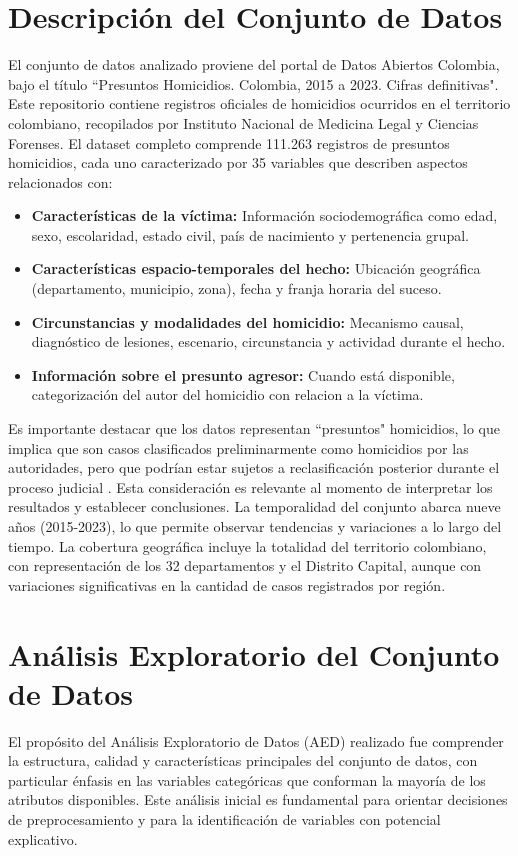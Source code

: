\documentclass[lettersize,journal]{IEEEtran}
\begin{document}
\section{Descripción del Conjunto de Datos}
El conjunto de datos analizado proviene del portal de Datos Abiertos Colombia, bajo el título ``Presuntos Homicidios. Colombia, 2015 a 2023. Cifras definitivas". Este repositorio contiene registros oficiales de homicidios ocurridos en el territorio colombiano, recopilados por Instituto Nacional de Medicina Legal y Ciencias Forenses.
El dataset completo comprende 111.263 registros de presuntos homicidios, cada uno caracterizado por 35 variables que describen aspectos relacionados con:
\begin{itemize}
\item \textbf{Características de la víctima:} Información sociodemográfica como edad, sexo, escolaridad, estado civil, país de nacimiento y pertenencia grupal.
\item \textbf{Características espacio-temporales del hecho:} Ubicación geográfica (departamento, municipio, zona), fecha y franja horaria del suceso.
\item \textbf{Circunstancias y modalidades del homicidio:} Mecanismo causal, diagnóstico de lesiones, escenario, circunstancia y actividad durante el hecho.
\item \textbf{Información sobre el presunto agresor:} Cuando está disponible, categorización del autor del homicidio con relacion a la víctima.
\end{itemize}
Es importante destacar que los datos representan ``presuntos" homicidios, lo que implica que son casos clasificados preliminarmente como homicidios por las autoridades, pero que podrían estar sujetos a reclasificación posterior durante el proceso judicial \cite{Datos2023}. Esta consideración es relevante al momento de interpretar los resultados y establecer conclusiones.
La temporalidad del conjunto abarca nueve años (2015-2023), lo que permite observar tendencias y variaciones a lo largo del tiempo. La cobertura geográfica incluye la totalidad del territorio colombiano, con representación de los 32 departamentos y el Distrito Capital, aunque con variaciones significativas en la cantidad de casos registrados por región.
\section{Análisis Exploratorio del Conjunto de Datos}
El propósito del Análisis Exploratorio de Datos (AED) realizado fue comprender la estructura, calidad y características principales del conjunto de datos, con particular énfasis en las variables categóricas que conforman la mayoría de los atributos disponibles. Este análisis inicial es fundamental para orientar decisiones de preprocesamiento y para la identificación de variables con potencial explicativo.
\end{document}
